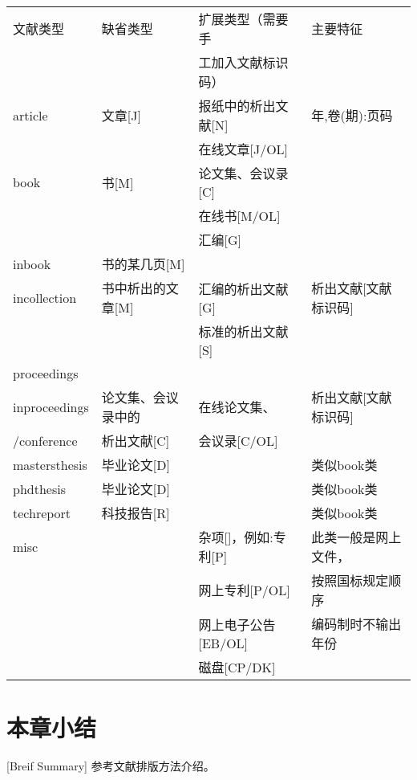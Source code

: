 \begin{table}[htbp]
\vspace{0.5em}\centering\wuhao
\begin{tabular}{llll}
\toprule[1.5pt]
文献类型 & 缺省类型 & 扩展类型（需要手 & 主要特征\\
 &  & 工加入文献标识码） & \\
\midrule[1pt]
article & 文章[J] & 报纸中的析出文献[N] & 年,卷(期):页码\\
 &  & 在线文章[J/OL] & \\
book & 书[M] & 论文集、会议录[C] & \\
 &  & 在线书[M/OL] & \\
 &  & 汇编[G] & \\
inbook & 书的某几页[M] &  & \\
incollection & 书中析出的文章[M] & 汇编的析出文献[G] & 析出文献[文献标识码]\\
 &  & 标准的析出文献[S] & \\
proceedings &  &  & \\
inproceedings & 论文集、会议录中的 & 在线论文集、 & 析出文献[文献标识码]\\
/conference & 析出文献[C] & 会议录[C/OL] & \\
mastersthesis & 毕业论文[D] &  & 类似book类\\
phdthesis & 毕业论文[D] &  & 类似book类\\
techreport & 科技报告[R] &  & 类似book类\\
misc &  & 杂项[]，例如:专利[P] & 此类一般是网上文件，\\
 &  & 网上专利[P/OL] & 按照国标规定顺序\\
 &  & 网上电子公告[EB/OL] & 编码制时不输出年份\\
 &  & 磁盘[CP/DK] & \\
\bottomrule[1.5pt]
\end{tabular}
\end{table}

\section*{本章小结}[Breif Summary]
参考文献排版方法介绍。

